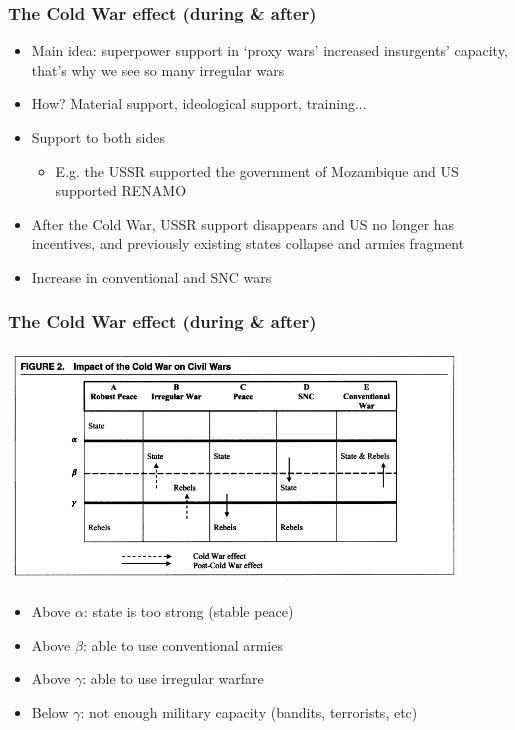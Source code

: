 \documentclass[utf8, xcolor=dvipsnames]{beamer}
\begin{document}
\begin{frame}
\frametitle{The Cold War effect (during \& after)}
\centering

\begin{itemize}[<+->]
  \item Main idea: superpower support in `proxy wars' increased insurgents' capacity, that's why we see so many irregular wars
  \item How? Material support, ideological support, training...
  \item Support to both sides
  \begin{itemize}
    \item E.g. the USSR supported the government of Mozambique and US supported RENAMO
  \end{itemize}
  \item After the Cold War, USSR support disappears and US no longer has incentives, and previously existing states collapse and armies fragment
  \item Increase in conventional and SNC wars
\end{itemize}

\end{frame}


\begin{frame}
\frametitle{The Cold War effect (during \& after)}
\centering

\includegraphics[width = 0.9\textwidth]{img/kalyvas_balcells_cold_war}

\begin{itemize}[<+->]
  \item Above $\alpha$: state is too strong (stable peace)
  \item Above $\beta$: able to use conventional armies
  \item Above $\gamma$: able to use irregular warfare
  \item Below $\gamma$: not enough military capacity (bandits, terrorists, etc)
\end{itemize}

\end{frame}
\end{document}
